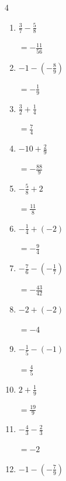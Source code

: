 \begin{multicols}{4}
\begin{enumerate}
  \item $\displaystyle \frac{3}{7} - \frac{5}{8}$

        $\displaystyle =-\frac{11}{56}$

\columnbreak %

\resetques

  \item $\displaystyle -1 - \left(-\frac{8}{9}\right)$

        $\displaystyle =-\frac{1}{9}$

  \item $\displaystyle \frac{3}{2} + \frac{1}{4}$

        $\displaystyle =\frac{7}{4}$

  \item $\displaystyle -10 + \frac{2}{9}$

        $\displaystyle =-\frac{88}{9}$

  \item $\displaystyle -\frac{5}{8} + 2$

        $\displaystyle =\frac{11}{8}$

  \item $\displaystyle -\frac{1}{4} + \left(-2\right)$

        $\displaystyle =-\frac{9}{4}$

  \item $\displaystyle -\frac{7}{6} - \left(-\frac{1}{7}\right)$

        $\displaystyle =-\frac{43}{42}$

  \item $\displaystyle -2 + \left(-2\right)$

        $\displaystyle =-4$

  \item $\displaystyle -\frac{1}{5} - \left(-1\right)$

        $\displaystyle =\frac{4}{5}$

  \item $\displaystyle 2 + \frac{1}{9}$

        $\displaystyle =\frac{19}{9}$

  \item $\displaystyle -\frac{4}{3} - \frac{2}{3}$

        $\displaystyle =-2$

\columnbreak %

  \item $\displaystyle -1 - \left(-\frac{7}{9}\right)$


\end{enumerate}
\end{multicols}
